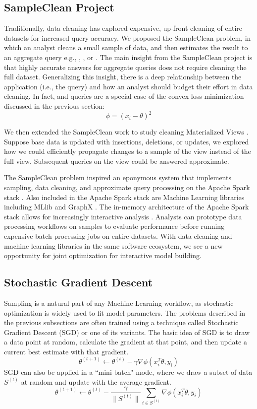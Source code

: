 \iffalse

\subsection{SampleClean Project}

Traditionally, data cleaning has explored expensive, up-front cleaning of entire datasets for increased query accuracy.
We proposed the SampleClean problem, in which an analyst cleans a small sample of data, and then estimates the result to an aggregate query e.g., \sumfunc, \countfunc, or \avgfunc.
The main insight from the SampleClean project is that highly accurate answers for aggregate queries does not require cleaning the full dataset.
Generalizing this insight, there is a deep relationship between the application (i.e., the query) and how an analyst should budget their effort in data cleaning.
In fact, \avgfunc and \sumfunc queries are a special case of the convex loss minimization discussed in the previous section:
\[
\phi = (x_{i} - \theta)^2
\]

We then extended the SampleClean work to study cleaning Materialized Views \cite{technicalReport}.
Suppose base data is updated with insertions, deletions, or updates, we explored how we could efficiently propagate
changes to a sample of the view instead of the full view.
Subsequent queries on the view could be answered approximate.

The SampleClean problem inspired an eponymous system that implements sampling, data cleaning, and approximate query processing on the Apache Spark stack \cite{sampleclean}.
Also included in the Apache Spark stack are Machine Learning libraries including MLlib \cite{mllib} and GraphX \cite{graphx}.
The in-memory architecture of the Apache Spark stack allows for increasingly interactive analysis \cite{AgarwalMPMMS13, armbrust2015spark}.
Analysts can prototype data processing workflows on samples to evaluate performance before running expensive batch processing jobs on entire datasets.
With data cleaning and machine learning libraries in the same software ecosystem, we see a new opportunity for joint optimization for interactive model building.



\subsection{Stochastic Gradient Descent}
Sampling is a natural part of any Machine Learning workflow, as stochastic optimization is widely used to fit model parameters.
The problems described in the previous subsections are often trained using a technique called Stochastic Gradient Descent (SGD) or one of its variants.
The basic idea of SGD is to draw a data point at random, calculate the gradient at that point, and then update a current best estimate with that gradient.
\[
\theta^{(t+1)}\leftarrow\theta^{(t)}-\gamma\nabla\phi(x_{i}^T\theta,y_{i})
\]
 SGD can also be applied in a ``mini-batch" mode, where we draw a subset of data $S^{(t)}$ at random and update with the average gradient.
 \[
 \theta^{(t+1)}\leftarrow\theta^{(t)}-\frac{\gamma}{\|S^{(t)}\|}\sum_{i\in S^{(t)}}\nabla\phi(x_{i}^T\theta,y_{i})
 \]

